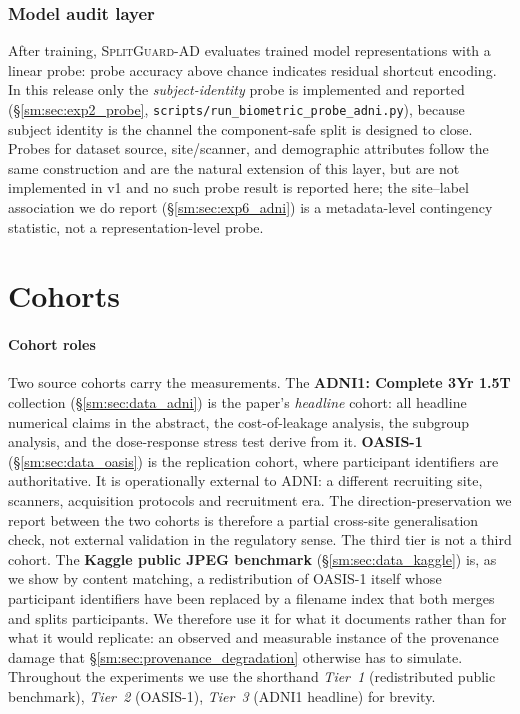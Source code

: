 \documentclass[11pt]{article}
\newcommand{\SGA}{\textsc{SplitGuard-AD}}
\providecommand{\pb}{\discretionary{}{}{}}
\begin{document}
\subsubsection{Model audit layer}
\label{sm:sec:model_audit}
After training, \SGA{} evaluates trained model representations with a
linear probe: probe accuracy above chance indicates residual shortcut
encoding. In this release only the \emph{subject-identity} probe is
implemented and reported (\S\ref{sm:sec:exp2_probe},
\texttt{scripts/\pb run\_biometric\_probe\_adni.py}), because
subject identity is the channel the component-safe split is designed
to close. Probes for dataset source, site/scanner, and demographic
attributes follow the same construction and are the natural extension
of this layer, but are not implemented in v1 and no such probe result
is reported here; the site--label association we do report
(\S\ref{sm:sec:exp6_adni}) is a metadata-level contingency statistic, not
a representation-level probe.



\section{Cohorts}
\label{sm:sec:data}

\paragraph{Cohort roles}
Two source cohorts carry the measurements. The
\textbf{ADNI1: Complete 3Yr 1.5T} collection (\S\ref{sm:sec:data_adni})
is the paper's \emph{headline} cohort: all headline numerical claims
in the abstract, the cost-of-leakage analysis, the subgroup analysis,
and the dose-response stress test derive from it.
\textbf{OASIS-1} (\S\ref{sm:sec:data_oasis}) is the replication cohort, where
participant identifiers are authoritative. It is operationally external to
ADNI: a different recruiting site, scanners, acquisition protocols and
recruitment era. The direction-preservation we report between the two
cohorts is therefore a partial cross-site generalisation check, not
external validation in the regulatory sense. The third tier is not a third cohort. The \textbf{Kaggle
public JPEG benchmark} (\S\ref{sm:sec:data_kaggle}) is, as we show by
content matching, a redistribution of OASIS-1 itself whose
participant identifiers have been replaced by a filename index that
both merges and splits participants. We therefore use it for what it
documents rather than for what it would replicate: an observed and
measurable instance of the provenance damage that
\S\ref{sm:sec:provenance_degradation} otherwise has to simulate.
Throughout the experiments we use the shorthand \emph{Tier~1}
(redistributed public benchmark), \emph{Tier~2} (OASIS-1),
\emph{Tier~3} (ADNI1 headline) for brevity.
\end{document}

